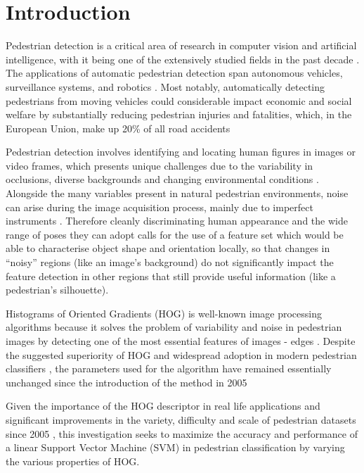 \section{Introduction}\label{sec:introduction}
Pedestrian detection is a critical area of research in computer vision and artificial intelligence, with it being one of the extensively studied fields in the past decade \cite{dollar_2012_pedestrian}. The applications of automatic pedestrian detection span autonomous vehicles, surveillance systems, and robotics \cite{dollar_2012_pedestrian}. Most notably, automatically detecting pedestrians from moving vehicles could considerable impact economic and social welfare by substantially reducing pedestrian injuries and fatalities, which, in the European Union, make up 20\% of all road accidents \cite{slootmans_2021_european}

Pedestrian detection involves identifying and locating human figures in images or video frames, which presents unique challenges due to the variability in occlusions, diverse backgrounds and changing environmental conditions \cite{dollar_2012_pedestrian}. Alongside the many variables present in natural pedestrian environments, noise can arise during the image acquisition process, mainly due to imperfect instruments \cite{faraji_2006_ccd}. Therefore cleanly discriminating human appearance and the wide range of poses they can adopt calls for the use of a feature set which would be able to characterise object shape and orientation locally, so that changes in “noisy” regions (like an image’s background) do not significantly impact the feature detection in other regions that still provide useful information (like a pedestrian’s silhouette).

Histograms of Oriented Gradients (HOG) \cite{dalal_2005_histograms} is well-known \cite{dollar_2012_pedestrian} image processing algorithms because it solves the problem of variability and noise in pedestrian images by detecting one of the most essential features of images - edges \cite{niebles2012edge} \cite{dalal_2005_histograms}. Despite the suggested superiority of HOG \cite{dalal_2005_histograms} and widespread adoption in modern pedestrian classifiers \cite{dollar_2012_pedestrian}, the parameters used for the algorithm have remained essentially unchanged since the introduction of the method in 2005 \cite{dalal_2005_histograms}

Given the importance of the HOG descriptor in real life applications and significant improvements in the variety, difficulty and scale of pedestrian datasets since 2005 \cite{dollar_2012_pedestrian}, this investigation seeks to maximize the accuracy and performance of a linear Support Vector Machine (SVM) in pedestrian classification by varying the various properties of HOG.